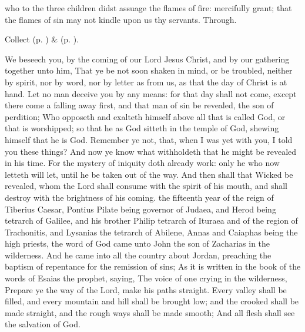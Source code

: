
\collect
{} who to the three children didst assuage the flames of fire: mercifully grant; that the flames of sin may not kindle upon us thy servants. Through.

\begin{rubric}
     Collect  (p. \pageref{AdventICollect}) \&   (p. \pageref{SPMaryInAdvent}).
\end{rubric}

 We beseech you, by the coming of our Lord Jesus Christ, and by our gathering together unto him, That ye be not soon shaken in mind, or be troubled, neither by spirit, nor by word, nor by letter as from us, as that the day of Christ is at hand. Let no man deceive you by any means: for that day shall not come, except there come a falling away first, and that man of sin be revealed, the son of perdition; Who opposeth and exalteth himself above all that is called God, or that is worshipped; so that he as God sitteth in the temple of God, shewing himself that he is God. Remember ye not, that, when I was yet with you, I told you these things? And now ye know what withholdeth that he might be revealed in his time. For the mystery of iniquity doth already work: only he who now letteth will let, until he be taken out of the way. And then shall that Wicked be revealed, whom the Lord shall consume with the spirit of his mouth, and shall destroy with the brightness of his coming.
 the fifteenth year of the reign of Tiberius Caesar, Pontius Pilate being governor of Judaea, and Herod being tetrarch of Galilee, and his brother Philip tetrarch of Ituraea and of the region of Trachonitis, and Lysanias the tetrarch of Abilene, Annas and Caiaphas being the high priests, the word of God came unto John the son of Zacharias in the wilderness. And he came into all the country about Jordan, preaching the baptism of repentance for the remission of sins; As it is written in the book of the words of Esaias the prophet, saying, The voice of one crying in the wilderness, Prepare ye the way of the Lord, make his paths straight. Every valley shall be filled, and every mountain and hill shall be brought low; and the crooked shall be made straight, and the rough ways shall be made smooth; And all flesh shall see the salvation of God.

